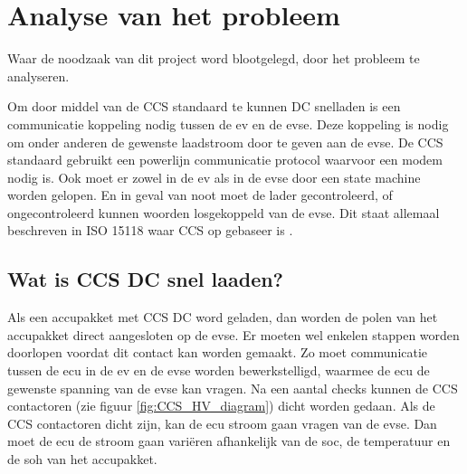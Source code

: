\chapter{Analyse van het probleem}
\label{Analyse_van_het_probleem}

\begin{center}
    \begin{minipage}{0.5\textwidth}
        \begin{small}
            Waar de noodzaak van dit project word blootgelegd, door het probleem te analyseren.
        \end{small} 
    \end{minipage}
    \vspace{0.5cm}
\end{center}

Om door middel van de CCS standaard te kunnen DC snelladen is een communicatie
koppeling nodig tussen de \ac{ev} en de \ac{evse}. Deze koppeling is nodig om
onder anderen de gewenste laadstroom door te geven aan de \ac{evse}. De CCS
standaard gebruikt een powerlijn communicatie protocol waarvoor een \ac{modem}
nodig is. Ook moet er zowel in de \ac{ev} als in de \ac{evse} door een state
machine worden gelopen. En in geval van noot moet de lader gecontroleerd, of
ongecontroleerd kunnen woorden losgekoppeld van de \ac{evse}. Dit staat
allemaal beschreven in ISO 15118 waar CCS op gebaseer is \cite{15118}.

\section{Wat is CCS DC snel laaden?}

Als een accupakket met CCS DC word geladen, dan worden de polen van het
accupakket direct aangesloten op de \ac{evse}. Er moeten wel enkelen stappen
worden doorlopen voordat dit contact kan worden gemaakt. Zo moet communicatie
tussen de \ac{ecu} in de \ac{ev} en de \ac{evse} worden bewerkstelligd, waarmee
de \ac{ecu} de gewenste spanning van de \ac{evse} kan vragen. Na een aantal
checks kunnen de CCS contactoren (zie figuur \ref{fig:CCS_HV_diagram}) dicht
worden gedaan. Als de CCS contactoren dicht zijn, kan de \ac{ecu} stroom gaan
vragen van de \ac{evse}. Dan moet de \ac{ecu} de stroom gaan variëren
afhankelijk van de \ac{soc}, de temperatuur en de \ac{soh} van het accupakket.

